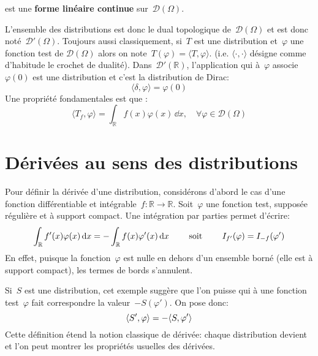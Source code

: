 \medskip
\begin{definition}[Distribution]
 est une \textbf{forme linéaire continue} sur~$\mathcal{D}(\Omega)$.
\end{definition}

L'ensemble des distributions est donc le dual topologique de~$\mathcal{D}(\Omega)$ et est donc noté~$\mathcal{D}'(\Omega)$.
\medskipvm
Toujours aussi classiquement, si~$T$ est une distribution et~$\varphi$ une fonction test de $\mathcal{D}(\Omega)$ alors on note~$T(\varphi)=\langle T,\varphi \rangle$. (i.e. $\langle\cdot,\cdot\rangle$ désigne comme d'habitude le crochet de dualité).
\medskipvm
Dans~$\mathcal{D}'(\mathbb{R})$, l'application qui à~$\varphi$ associe~$\varphi(0)$ est une distribution et c'est la distribution de Dirac:
\begin{equation}
\langle\delta,\varphi\rangle=\varphi(0)
\end{equation}
\medskipvm
Une propriété fondamentales est que :
\begin{equation}
  \langle T_f,\varphi\rangle=\int_{\mathbb{R}}f(x)\varphi(x)\,\dd x, \quad \forall \varphi\in\mathcal{D}(\Omega)
\end{equation}


\medskip
\section{Dérivées au sens des distributions}
Pour définir la dérivée d'une distribution, considérons d'abord le cas d'une fonction différentiable et intégrable~$f:\mathbb{R}\rightarrow\mathbb{R}$.
Soit~$\varphi$ une fonction test, supposée régulière et à support compact.
Une intégration par parties permet d'écrire:
\begin{equation}
  \int_{\mathbb R} f'(x) \varphi(x)\,\text{d} x = -\int_{\mathbb R} f(x)\varphi'(x)\,\text{d} x \qquad\text{ soit }\qquad I_{f'}(\varphi)=I_{-f}(\varphi')
\end{equation}
En effet, puisque la fonction~$\varphi$ est nulle en dehors d'un ensemble borné (elle est à support compact), les termes de bords s'annulent.

\medskip
\begin{definition}
Si~$S$ est une distribution, cet exemple suggère que l'on puisse  qui à une fonction test~$\varphi$ fait correspondre la valeur~$- S(\varphi')$. On pose donc:
\begin{equation}\colorred
  \langle S', \varphi \rangle = - \langle S, \varphi' \rangle
\end{equation}
Cette définition étend la notion classique de dérivée: chaque distribution devient  et l'on peut montrer les propriétés usuelles des dérivées.
\end{definition}

